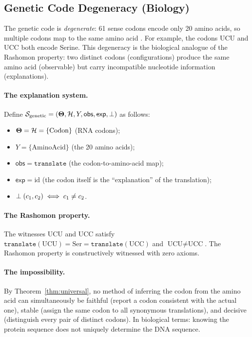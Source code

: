 \subsection{Genetic Code Degeneracy (Biology)}
\label{sec:instance-genetic-code}

The genetic code is \emph{degenerate}: 61 sense codons encode only 20 amino
acids, so multiple codons map to the same amino acid \citep{crick1966codon}.  For example, the
codons UCU and UCC both encode Serine.  This degeneracy is the biological
analogue of the Rashomon property: two distinct codons (configurations)
produce the same amino acid (observable) but carry incompatible nucleotide
information (explanations).

\paragraph{The explanation system.}
Define $\mathcal{S}_{\mathrm{genetic}} = (\mathbf{\Theta}, \mathcal{H}, Y, \mathsf{obs},
\mathsf{exp}, \perp)$ as follows:
\begin{itemize}
  \item $\mathbf{\Theta} = \mathcal{H} = \{\text{Codon}\}$ (RNA codons);
  \item $Y = \{\text{AminoAcid}\}$ (the 20 amino acids);
  \item $\mathsf{obs} = \texttt{translate}$ (the codon-to-amino-acid map);
  \item $\mathsf{exp} = \mathrm{id}$ (the codon itself is the ``explanation''
    of the translation);
  \item $\perp(c_1, c_2) \iff c_1 \ne c_2$.
\end{itemize}

\paragraph{The Rashomon property.}
The witnesses UCU and UCC satisfy
$\texttt{translate}(\text{UCU}) = \text{Ser} = \texttt{translate}(\text{UCC})$
and $\text{UCU} \ne \text{UCC}$.  The Rashomon property is constructively
witnessed with zero axioms.

\paragraph{The impossibility.}
By Theorem~\ref{thm:universal}, no method of inferring the codon from the
amino acid can simultaneously be faithful (report a codon consistent with the
actual one), stable (assign the same codon to all synonymous translations),
and decisive (distinguish every pair of distinct codons).  In biological terms:
knowing the protein sequence does not uniquely determine the DNA sequence.

